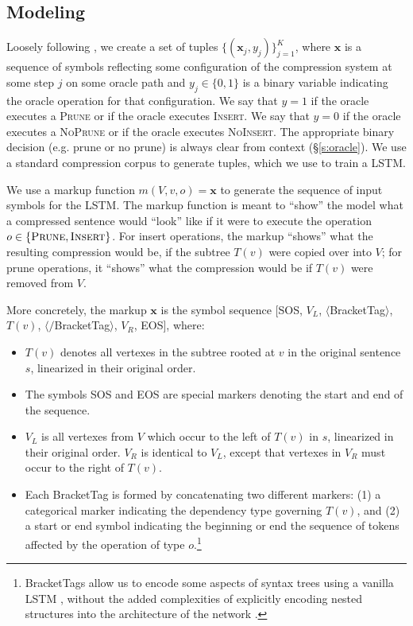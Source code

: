 \documentclass[11pt,a4paper]{article}
\begin{document}
\subsection{Modeling}\label{s:modeling}

Loosely following \citet{D14-1082}, we create a set of tuples $\{(\bm{x}_j, y_j) \}_{j=1}^{K}$, where $\bm{x}$ is a sequence of symbols reflecting some configuration of the compression system at some step $j$ on some oracle path and $y_j \in \{0,1\}$ is a binary variable indicating the oracle operation for that configuration. We say that $y=1$ if the oracle executes a \textsc{Prune} or if the oracle executes \textsc{Insert}. We say that $y=0$ if the oracle executes a \textsc{NoPrune} or if the oracle executes \textsc{NoInsert}. The appropriate binary decision (e.g. prune or no prune) is always clear from context (\S\ref{s:oracle}). We use a standard compression corpus \cite{filippova2013overcoming} to generate tuples, which we use to train a LSTM.

We use a markup function $m(V,v,o)=\bm{x}$ to generate the sequence of input symbols for the LSTM. The markup function is meant to ``show'' the model what a compressed sentence would ``look'' like if it were to execute the operation $o \in \{\textsc{Prune}, \textsc{Insert}\}$. For insert operations, the markup ``shows'' what the resulting compression would be, if the subtree $T(v)$ were copied over into $V$; for prune operations, it ``shows'' what the compression would be if $T(v)$ were removed from $V$.

More concretely, the markup $\bm{x}$ is the symbol sequence [SOS, $V_L$, $\langle$BracketTag{\small $\rangle$}, $T(v)$, $\langle /$BracketTag$\rangle$, $V_R$, EOS], where:

\begin{itemize}
\item{$T(v)$ denotes all vertexes in the subtree rooted at $v$ in the original sentence $s$, linearized in their original order.}
\item{The symbols SOS and EOS are special markers denoting the start and end of the sequence.}
\item{$V_L$ is all vertexes from $V$ which occur to the left of $T(v)$ in $s$, linearized in their original order. $V_R$ is identical to $V_L$, except that vertexes in $V_R$ must occur to the right of $T(v)$.}
\item{Each BracketTag is formed by concatenating two different markers: (1) a categorical marker indicating the dependency type governing $T(v)$, and (2) a start or end symbol indicating the beginning or end the sequence of tokens affected by the operation of type $o$.\footnote{BracketTags allow us to encode some aspects of syntax trees using a vanilla LSTM \cite{Vinyals2015GrammarAA,Aharoni2017TowardsSN}, without the added complexities of explicitly encoding nested structures into the architecture of the network \cite{Tai2015ImprovedSR,Dyer2016RecurrentNN}.}}
\end{itemize}
\end{document}
